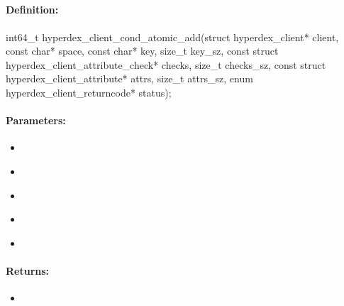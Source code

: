 \pagebreak
\subsection{}
\label{api:c:cond_atomic_add}


\paragraph{Definition:}
\begin{ccode}
int64_t hyperdex_client_cond_atomic_add(struct hyperdex_client* client,
        const char* space,
        const char* key, size_t key_sz,
        const struct hyperdex_client_attribute_check* checks, size_t checks_sz,
        const struct hyperdex_client_attribute* attrs, size_t attrs_sz,
        enum hyperdex_client_returncode* status);
\end{ccode}

\paragraph{Parameters:}
\begin{itemize}[noitemsep]
\item {}\\

\item {}\\

\item {}\\

\item {}\\

\item {}\\

\end{itemize}

\paragraph{Returns:}
\begin{itemize}[noitemsep]
\item {}\\

\end{itemize}

